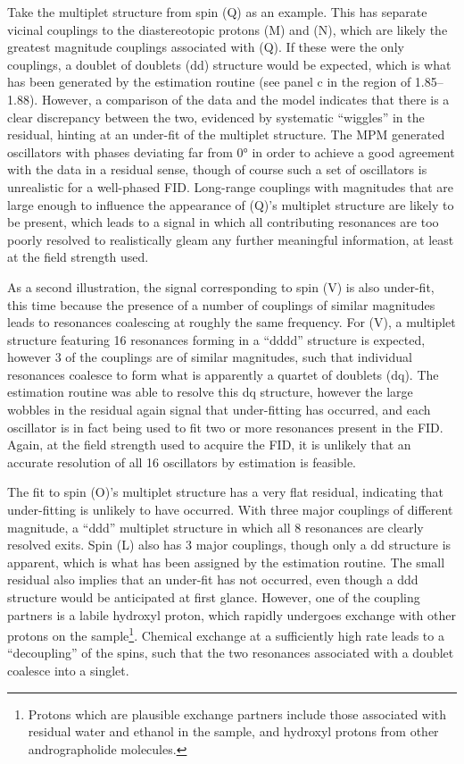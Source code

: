 Take the multiplet structure from spin (Q) as an example.
This has separate vicinal couplings to the
diastereotopic protons (M) and (N), which are likely the greatest magnitude couplings
associated with (Q). If these were the only couplings, a doublet of doublets
(dd) structure would be expected, which is what has been generated by
the estimation routine (see panel c in the region of
\SIrange{1.85}{1.88}{\partspermillion}). However, a comparison of the data and
the model indicates that there is a clear discrepancy between the two,
evidenced by systematic ``wiggles'' in the residual, hinting at an
under-fit of the multiplet structure.
The \ac{MPM} generated oscillators with phases deviating far from \ang{0} in
order to achieve a good agreement with the data in a residual sense, though of
course such a set of oscillators is unrealistic for a well-phased \ac{FID}.
Long-range couplings with magnitudes that are large enough to influence the
appearance of (Q)'s multiplet structure are likely to be present, which leads
to a signal in which all contributing resonances are too poorly resolved to
realistically gleam any further meaningful information, at least at the field
strength used.

As a second illustration, the signal corresponding to spin (V) is also
under-fit, this time because the presence of a number of couplings of similar
magnitudes leads to resonances coalescing at roughly the same frequency. For
(V), a multiplet structure featuring 16 resonances forming in a ``dddd''
structure is expected, however 3 of the couplings are of similar magnitudes,
such that individual resonances coalesce to form what is apparently a quartet
of doublets (dq). The estimation routine was able to resolve this dq structure,
however the large wobbles in the residual again signal that under-fitting has
occurred, and each oscillator is in fact being used to fit two or more
resonances present in the \ac{FID}. Again, at the field strength used to
acquire the \ac{FID}, it is unlikely that an accurate resolution of all 16
oscillators by estimation is feasible.

The fit to spin (O)'s multiplet structure has a very flat residual, indicating
that under-fitting is unlikely to have occurred. With three major couplings of
different magnitude, a ``ddd'' multiplet structure in which all 8 resonances
are clearly resolved exits. Spin (L) also has 3 major couplings, though only a
dd structure is apparent, which is what has been assigned by the estimation
routine. The small residual  also implies that an under-fit has not occurred,
even though a ddd structure would be anticipated at first glance. However, one
of the coupling partners is a labile hydroxyl proton, which rapidly undergoes
exchange with other protons on the sample\footnote{
    Protons which are plausible exchange partners include those associated with
    residual water and ethanol in the sample, and hydroxyl protons from other
    andrographolide molecules.
}. Chemical exchange at a sufficiently
high rate leads to a ``decoupling'' of the spins, such that the two resonances
associated with a doublet coalesce into a singlet\cite[Section
2.6.1.5]{Claridge2016}.
